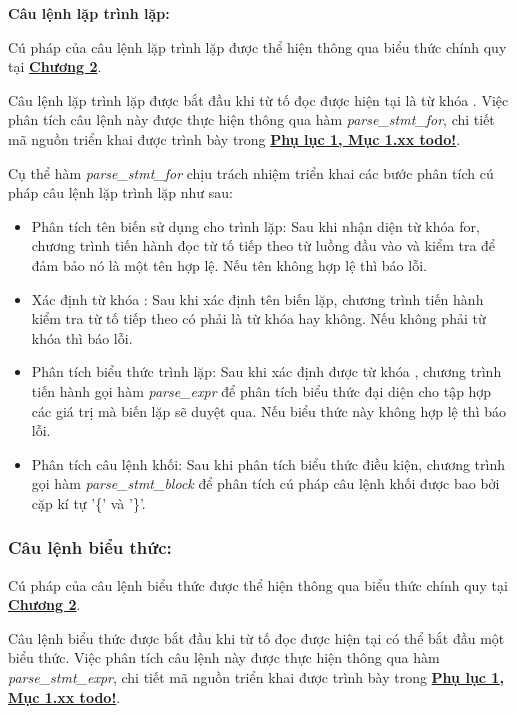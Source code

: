 \textbf{Câu lệnh lặp trình lặp:} 

Cú pháp của câu lệnh lặp trình lặp được thể hiện thông qua biểu thức chính quy tại \hyperref[ch2:while_stmt]{\bf Chương 2}.

Câu lệnh lặp trình lặp được bắt đầu khi từ tố đọc được hiện tại là từ khóa . Việc phân tích câu lệnh này được thực hiện thông qua hàm \textit{parse\_stmt\_for}, chi tiết mã nguồn triển khai được trình bày trong \hyperref[ap1:simple_token]{\bf Phụ lục 1, Mục 1.xx todo!}.

Cụ thể hàm \textit{parse\_stmt\_for} chịu trách nhiệm triển khai các bước phân tích cú pháp câu lệnh lặp trình lặp như sau:

\begin{itemize}
    \item Phân tích tên biến sử dụng cho trình lặp:
    Sau khi nhận diện từ khóa for, chương trình tiến hành đọc từ tố tiếp theo từ luồng đầu vào và kiểm tra để đảm bảo nó là một tên hợp lệ. Nếu tên không hợp lệ thì báo lỗi. %
    \item Xác định từ khóa :
    Sau khi xác định tên biến lặp, chương trình tiến hành kiểm tra từ tố tiếp theo có phải là từ khóa  hay không. Nếu không phải từ khóa  thì báo lỗi. %
    \item Phân tích biểu thức trình lặp:
    Sau khi xác định được từ khóa , chương trình tiến hành gọi hàm \textit{parse\_expr} để phân tích biểu thức đại diện cho tập hợp các giá trị mà biến lặp sẽ duyệt qua. Nếu biểu thức này không hợp lệ thì báo lỗi. %
    \item Phân tích câu lệnh khối:
    Sau khi phân tích biểu thức điều kiện, chương trình gọi hàm \textit{parse\_stmt\_block} để phân tích cú pháp câu lệnh khối được bao bởi cặp kí tự '\{' và '\}'.
\end{itemize}

\subsubsection{Câu lệnh biểu thức:} 
Cú pháp của câu lệnh biểu thức được thể hiện thông qua biểu thức chính quy tại \hyperref[ch2:expr_stmt]{\bf Chương 2}.

Câu lệnh biểu thức được bắt đầu khi từ tố đọc được hiện tại có thể bắt đầu một biểu thức. Việc phân tích câu lệnh này được thực hiện thông qua hàm \textit{parse\_stmt\_expr}, chi tiết mã nguồn triển khai được trình bày trong \hyperref[ap1:simple_token]{\bf Phụ lục 1, Mục 1.xx todo!}.

